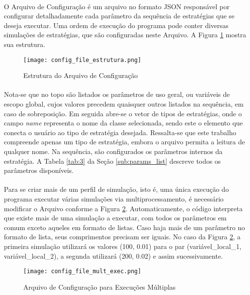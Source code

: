 \paragraph{} O Arquivo de Configuração é um arquivo no formato JSON responsável por configurar detalhadamente cada parâmetro da sequência de estratégias que se deseja executar. Uma ordem de execução do programa pode conter diversas simulações de estratégias, que são configuradas neste Arquivo. A Figura \ref{fig:101} mostra sua estrutura.

\begin{figure}[!htb]
    \texttt{[image: config\_file\_estrutura.png]}
    \centering
    \caption{Estrutura do Arquivo de Configuração}
    \label{fig:101}
\end{figure}

\paragraph{} Nota-se que no topo são listados os parâmetros de uso geral, ou variáveis de escopo global, cujos valores precedem quaisquer outros listados na sequência, em caso de sobreposição. Em seguida abre-se o vetor de tipos de estratégias, onde o campo \textit{name} representa o nome da classe selecionada, sendo este o elemento que conecta o usuário ao tipo de estratégia desejada. Ressalta-se que este trabalho compreende apenas um tipo de estratégia, embora o arquivo permita a leitura de qualquer nome. Na sequência, são configurados os parâmetros internos da estratégia. A Tabela \ref{tab:3} da Seção \ref{sub:params_list} descreve todos os parâmetros disponíveis.

\paragraph{} Para se criar mais de um perfil de simulação, isto é, uma única execução do programa executar várias simulações via multiprocessamento, é necessário modificar o Arquivo conforme a Figura \ref{fig:102}. Automaticamente, o código interpreta que existe mais de uma simulação a executar, com todos os parâmetros em comum exceto aqueles em formato de listas. Caso haja mais de um parâmetro no formato de lista, seus comprimentos precisam ser iguais. No caso da Figura \ref{fig:102}, a primeira simulação utilizará os valores (100, 0.01) para o par (variável\_local\_1, variável\_local\_2), a segunda utilizará (200, 0.02) e assim sucessivamente.

\begin{figure}[!htb]
    \texttt{[image: config\_file\_mult\_exec.png]}
    \centering
    \caption{Arquivo de Configuração para Execuções Múltiplas}
    \label{fig:102}
\end{figure}



